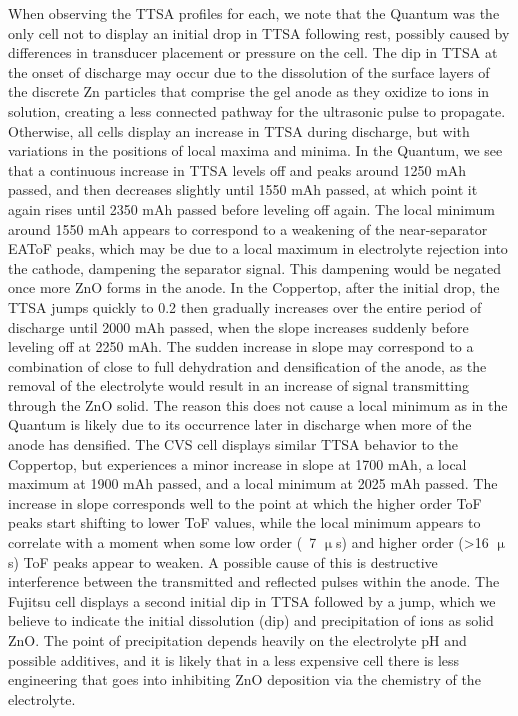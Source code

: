 When observing the TTSA profiles for each, we note that the Quantum was the only cell not to display an initial drop in TTSA following rest, possibly caused by differences in transducer placement or pressure on the cell. The dip in TTSA at the onset of discharge may occur due to the dissolution of the surface layers of the discrete Zn particles that comprise the gel anode as they oxidize to  ions in solution, creating a less connected pathway for the ultrasonic pulse to propagate.  Otherwise, all cells display an increase in TTSA during discharge, but with variations in the positions of local maxima and minima. In the Quantum, we see that a continuous increase in TTSA levels off and peaks around 1250 mAh passed, and then decreases slightly until 1550 mAh passed, at which point it again rises until 2350 mAh passed before leveling off again. The local minimum around 1550 mAh appears to correspond to a weakening of the near-separator EAToF peaks, which may be due to a local maximum in electrolyte rejection into the cathode, dampening the separator signal. This dampening would be negated once more ZnO forms in the anode. In the Coppertop, after the initial drop, the TTSA jumps quickly to 0.2 then gradually increases over the entire period of discharge until 2000 mAh passed, when the slope increases suddenly before leveling off at 2250 mAh. The sudden increase in slope may correspond to a combination of close to full dehydration and densification of the anode, as the removal of the electrolyte would result in an increase of signal transmitting through the ZnO solid. The reason this does not cause a local minimum as in the Quantum is likely due to its occurrence later in discharge when more of the anode has densified. The CVS cell displays similar TTSA behavior to the Coppertop, but experiences a minor increase in slope at 1700 mAh, a local maximum at 1900 mAh passed, and a local minimum at 2025 mAh passed. The increase in slope corresponds well to the point at which the higher order ToF peaks start shifting to lower ToF values, while the local minimum appears to correlate with a moment when some low order (~7 $\upmu$s) and higher order (>16 $\upmu$s) ToF peaks appear to weaken. A possible cause of this is destructive interference between the transmitted and reflected pulses within the anode. The Fujitsu cell displays a second initial dip in TTSA followed by a jump, which we believe to indicate the initial dissolution (dip) and precipitation of  ions as solid ZnO. The point of precipitation depends heavily on the electrolyte pH and possible additives, and it is likely that in a less expensive cell there is less engineering that goes into inhibiting ZnO deposition via the chemistry of the electrolyte.

